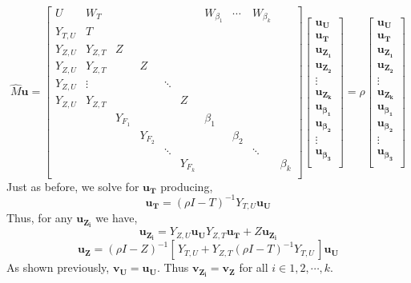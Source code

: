 \documentclass{paper}
\begin{document}
\[\hat{M} \mathbf{u} = 
\begin{bmatrix}
U & W_{T}&  &  & & & W_{\beta_{1}} & \cdots & W_{\beta_{k}} \\
Y_{T,U}  & T &  &  &  &  \\
Y_{Z,U}  & Y_{Z,T} & Z & \\
Y_{Z,U}  & Y_{Z,T} &  & Z \\
Y_{Z,U}  & \vdots & & &\ddots & \\
Y_{Z,U}  & Y_{Z,T} & & & & Z\\
  
  & & Y_{F_1}  &  &  & &\beta_1 & \\
  & & & Y_{F_2}  &  &  & &\beta_2 & \\

  & & & &\ddots &   &  & &\ddots & \\
  & & & & & Y_{F_k} & & & &\beta_k \\

\end{bmatrix}
\begin{bmatrix}
\mathbf{u_U} \\
\mathbf{u_T} \\
\mathbf{u_{Z_1}} \\
\mathbf{u_{Z_2}} \\
\vdots \\
\mathbf{u_{Z_k}} \\
\mathbf{u_{\beta_1}} \\
\mathbf{u_{\beta_2}} \\
\vdots \\
\mathbf{u_{\beta_3}} \\
\end{bmatrix}
=
\rho
\begin{bmatrix}
\mathbf{u_U} \\
\mathbf{u_T} \\
\mathbf{u_{Z_1}} \\
\mathbf{u_{Z_2}} \\
\vdots \\
\mathbf{u_{Z_k}} \\
\mathbf{u_{\beta_1}} \\
\mathbf{u_{\beta_2}} \\
\vdots \\
\mathbf{u_{\beta_3}} \\
\end{bmatrix}
\]
Just as before, we solve for $\mathbf{u_{T}}$ producing,
\[  \mathbf{u_T} = (\rho I - T)^{-1}Y_{T,U}\mathbf{u_U} \]
Thus, for any $\mathbf{u_{Z_i}}$ we have,
\[ \mathbf{u_{Z_i}} = Y_{Z,U} \mathbf{u_{U}} Y_{Z,T} \mathbf{u_{T}}+ Z \mathbf{u_{Z_i}} \]
\[ \mathbf{u_Z} = (\rho I - Z)^{-1}[\,Y_{T,U} + Y_{Z,T}(\rho I - T)^{-1}Y_{T,U}\,]\mathbf{u_U} \]
As shown previously, $\mathbf{v_U} =\mathbf{u_U}$. Thus $\mathbf{v_{Z_i}} =\mathbf{v_Z}$ for all $i \in {1,2,\cdots,k}$.
\end{document}
